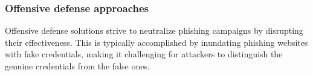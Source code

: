 \documentclass{ijitcs}
\begin{document}
\subsubsection{Offensive defense approaches}
Offensive defense solutions strive to neutralize phishing campaigns by disrupting their effectiveness. This is typically accomplished by inundating phishing websites with fake credentials, making it challenging for attackers to distinguish the genuine credentials from the false ones.






 
\end{document}
